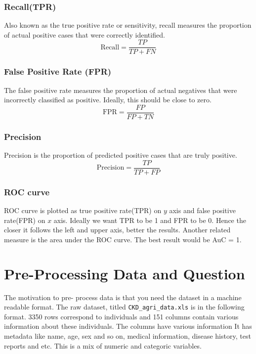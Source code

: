 \documentclass{article}
\begin{document}
\subsubsection*{Recall(TPR)}
Also known as the true positive rate or sensitivity, recall measures the proportion of actual positive cases that were correctly identified.
\[
\text{Recall} = \frac{TP}{TP + FN}
\]

\subsubsection*{False Positive Rate (FPR)}
The false positive rate measures the proportion of actual negatives that were incorrectly classified as positive. Ideally, this should be close to zero.
\[
\text{FPR} = \frac{FP}{FP + TN}
\]

\subsubsection*{Precision}
Precision is the proportion of predicted positive cases that are truly positive.
\[
\text{Precision} = \frac{TP}{TP + FP}
\]

\subsubsection{ROC curve}
ROC curve is plotted as true positive rate(TPR) on $y$ axis and false positive rate(FPR) on $x$ axis. Ideally
we want TPR to be 1 and FPR to be 0. Hence the closer it follows the left and upper axis, better
the results. Another related measure is the area under the ROC curve. The best result would be AuC = 1. 




\section{Pre-Processing Data and Question}
The motivation to pre- process data is that you need the dataset in a 
machine readable format. The raw dataset, titled \texttt{CKD\_agri\_data.xls} is in the 
following format. 3350 rows correspond to individuals and 151 columns contain
various information about these individuals. The columns have various information It has
metadata like name, age, sex and so on, medical information, disease history, test reports and etc. 
This is a mix of numeric and categoric variables. 
\end{document}
